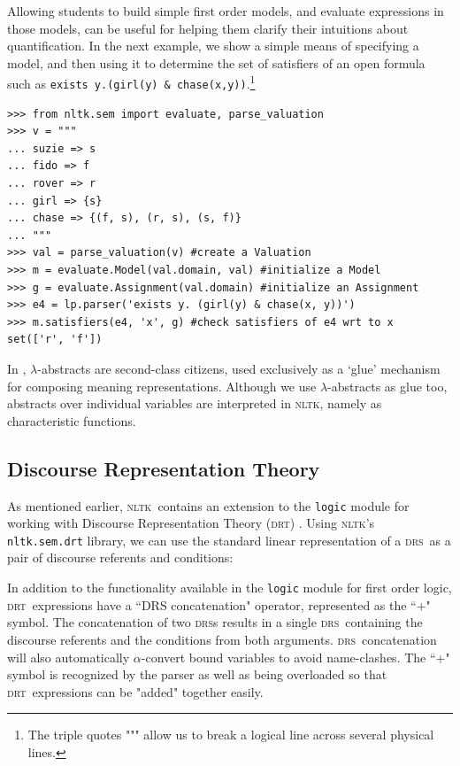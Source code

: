\documentclass[11pt,a4paper]{article}
\newcommand{\DRS}{\textsc{drs}}
\newcommand{\DRT}{\textsc{drt}}
\newcommand{\NLTK}{\textsc{nltk}}
\newcommand{\dhgdrs}[2]
{
    {
    \it
    \begin{tabular}{|l|}
    \hline
    ~ \vspace{-2ex} \\
    #1
    \\
    ~ \vspace{-2ex} \\
    \hline
    ~ \vspace{-2ex} \\
    #2
    \\
    ~ \\    %
    \hline
    \end{tabular}
    }
}
\newcommand{\dhgcode}[1]{{\tt #1}}
\begin{document}
Allowing students to build simple first order models, and evaluate
expressions in those models, can be useful for helping them clarify
their intuitions about quantification. In the next example, we show a
simple means of specifying a model, and then using it to determine the
set of satisfiers of an open formula such as
\verb!exists y.(girl(y) & chase(x,y))!.\footnote{The triple quotes """
  allow us to break a logical line across several physical lines.}
\begin{verbatim}
>>> from nltk.sem import evaluate, parse_valuation
>>> v = """
... suzie => s
... fido => f
... rover => r
... girl => {s}
... chase => {(f, s), (r, s), (s, f)}
... """
>>> val = parse_valuation(v) #create a Valuation
>>> m = evaluate.Model(val.domain, val) #initialize a Model
>>> g = evaluate.Assignment(val.domain) #initialize an Assignment
>>> e4 = lp.parser('exists y. (girl(y) & chase(x, y))')
>>> m.satisfiers(e4, 'x', g) #check satisfiers of e4 wrt to x
set(['r', 'f'])
\end{verbatim}

In \citet{BB}, $\lambda$-abstracts are second-class citizens, used
exclusively as a `glue' mechanism for composing meaning
representations. Although we use $\lambda$-abstracts as glue too,
abstracts over individual variables are interpreted in \NLTK, namely as
characteristic functions.

\subsection{Discourse Representation Theory}
As mentioned earlier, \NLTK\ contains an extension to the
\dhgcode{logic} module for working with Discourse Representation
Theory (\DRT) \citep{KampReyle}.  Using \NLTK's \dhgcode{nltk.sem.drt}
library, we can use the standard linear representation of a \DRS\ as a
pair of discourse referents and conditions:

\enumsentence{\label{drt3} \dhgcode{DRS([j,d],[(John = j), dog(d), sees(j,d)])}}

\noindent
In addition to the functionality available in the \texttt{logic} module
for first order logic, \DRT\ expressions have a ``DRS concatenation"
operator, represented as the ``+" symbol.  The concatenation of two
\DRS s results in a single \DRS\ containing the discourse referents and the conditions from both arguments.  \DRS\ concatenation will
also automatically $\alpha$-convert bound variables to avoid
name-clashes.  The ``+" symbol is recognized by the parser as well as
being overloaded so that \DRT\ expressions can be "added" together
easily.
\end{document}
